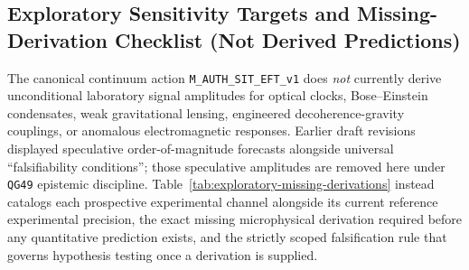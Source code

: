 \subsection{Exploratory Sensitivity Targets and Missing-Derivation Checklist (Not Derived Predictions)}

The canonical continuum action \texttt{M\_AUTH\_SIT\_EFT\_v1} does \emph{not} currently derive unconditional laboratory signal amplitudes for optical clocks, Bose--Einstein condensates, weak gravitational lensing, engineered decoherence-gravity couplings, or anomalous electromagnetic responses. Earlier draft revisions displayed speculative order-of-magnitude forecasts alongside universal ``falsifiability conditions''; those speculative amplitudes are removed here under \texttt{QG49} epistemic discipline. Table~\ref{tab:exploratory-missing-derivations} instead catalogs each prospective experimental channel alongside its current reference experimental precision, the exact missing microphysical derivation required before any quantitative prediction exists, and the strictly scoped falsification rule that governs hypothesis testing once a derivation is supplied.

